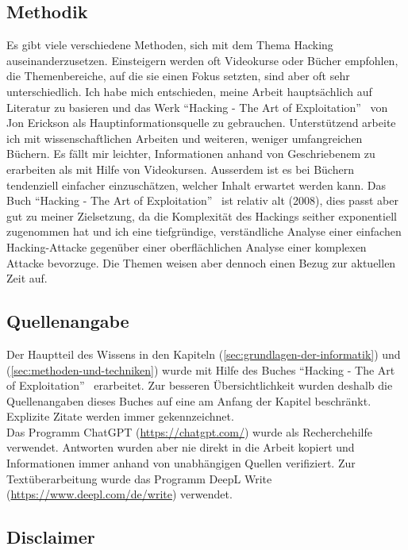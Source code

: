 \documentclass[11pt, a4paper]{article}
\begin{document}
\subsection{Methodik}
Es gibt viele verschiedene Methoden, sich mit dem Thema Hacking auseinanderzusetzen. Einsteigern werden oft Videokurse oder Bücher empfohlen, die Themenbereiche, auf die sie einen Fokus setzten, sind aber oft sehr unterschiedlich. Ich habe mich entschieden, meine Arbeit hauptsächlich auf Literatur zu basieren und das Werk ``Hacking - The Art of Exploitation''~\cite{erickson2008hacking} von Jon Erickson als Hauptinformationsquelle zu gebrauchen. Unterstützend arbeite ich mit wissenschaftlichen Arbeiten und weiteren, weniger umfangreichen Büchern. Es fällt mir leichter, Informationen anhand von Geschriebenem zu erarbeiten als mit Hilfe von Videokursen. Ausserdem ist es bei Büchern tendenziell einfacher einzuschätzen, welcher Inhalt erwartet werden kann. Das Buch ``Hacking - The Art of Exploitation''~\cite{erickson2008hacking} ist relativ alt (2008), dies passt aber gut zu meiner Zielsetzung, da die Komplexität des Hackings seither exponentiell zugenommen hat und ich eine tiefgründige, verständliche Analyse einer einfachen Hacking-Attacke gegenüber einer oberflächlichen Analyse einer komplexen Attacke bevorzuge. Die Themen weisen aber dennoch einen Bezug zur aktuellen Zeit auf.

\subsection{Quellenangabe}
Der Hauptteil des Wissens in den Kapiteln  (\ref{sec:grundlagen-der-informatik}) und  (\ref{sec:methoden-und-techniken}) wurde mit Hilfe des Buches ``Hacking - The Art of Exploitation''~\cite{erickson2008hacking} erarbeitet. Zur besseren Übersichtlichkeit wurden deshalb die Quellenangaben dieses Buches auf eine am Anfang der Kapitel beschränkt. Explizite Zitate werden immer gekennzeichnet. \\ Das Programm ChatGPT (\url{https://chatgpt.com/}) wurde als Recherchehilfe verwendet. Antworten wurden aber nie direkt in die Arbeit kopiert und Informationen immer anhand von unabhängigen Quellen verifiziert. Zur Textüberarbeitung wurde das Programm DeepL Write (\url{https://www.deepl.com/de/write}) verwendet. 

\subsection{Disclaimer}
\end{document}
